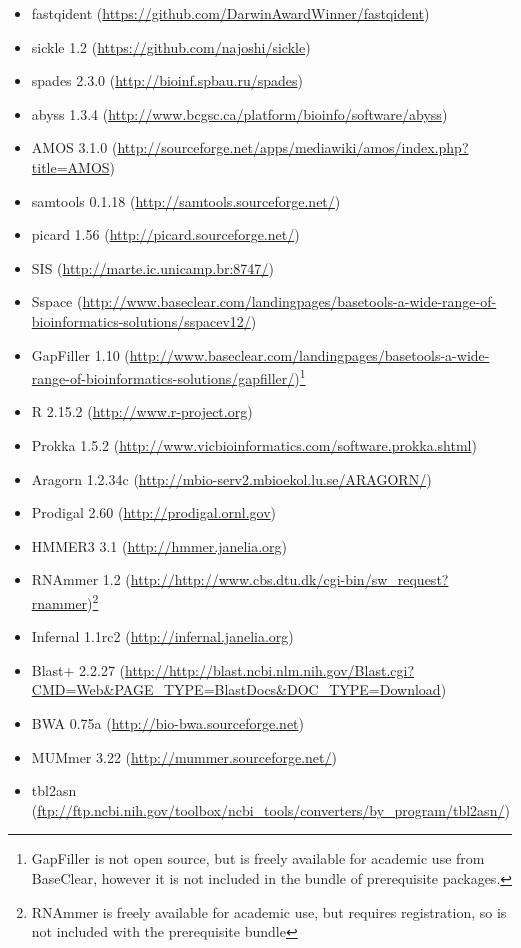\documentclass[a4paper,twoside,10pt]{article}
\begin{document}
\begin{itemize}
\item fastqident (\url{https://github.com/DarwinAwardWinner/fastqident})
\item sickle 1.2 (\url{https://github.com/najoshi/sickle})
\item spades 2.3.0 (\url{http://bioinf.spbau.ru/spades}) 
\item abyss 1.3.4 (\url{http://www.bcgsc.ca/platform/bioinfo/software/abyss}) 
\item AMOS 3.1.0 (\url{http://sourceforge.net/apps/mediawiki/amos/index.php?title=AMOS})
\item samtools 0.1.18 (\url{http://samtools.sourceforge.net/})
\item picard 1.56 (\url{http://picard.sourceforge.net/})
\item SIS (\url{http://marte.ic.unicamp.br:8747/})
\item Sspace
(\url{http://www.baseclear.com/landingpages/basetools-a-wide-range-of-bioinformatics-solutions/sspacev12/})
\item GapFiller 1.10
(\url{http://www.baseclear.com/landingpages/basetools-a-wide-range-of-bioinformatics-solutions/gapfiller/})\footnote{GapFiller
is not open source, but is freely available for academic use from BaseClear, however it is not
included in the bundle of prerequisite packages.} 
\item R 2.15.2 (\url{http://www.r-project.org})
\item Prokka 1.5.2 (\url{http://www.vicbioinformatics.com/software.prokka.shtml})
\item Aragorn 1.2.34c (\url{http://mbio-serv2.mbioekol.lu.se/ARAGORN/})
\item Prodigal 2.60 (\url{http://prodigal.ornl.gov})
\item HMMER3 3.1 (\url{http://hmmer.janelia.org})
\item RNAmmer 1.2 (\url{http://http://www.cbs.dtu.dk/cgi-bin/sw_request?rnammer})\footnote{RNAmmer
is freely available for academic use, but requires registration, so is not included with the
prerequisite bundle}
\item Infernal 1.1rc2 (\url{http://infernal.janelia.org})
\item Blast+ 2.2.27
(\url{http://http://blast.ncbi.nlm.nih.gov/Blast.cgi?CMD=Web&PAGE_TYPE=BlastDocs&DOC_TYPE=Download})
\item BWA 0.75a (\url{http://bio-bwa.sourceforge.net})
\item MUMmer 3.22 (\url{http://mummer.sourceforge.net/})
\item tbl2asn (\url{ftp://ftp.ncbi.nih.gov/toolbox/ncbi_tools/converters/by_program/tbl2asn/})
\end{itemize}
\end{document}
